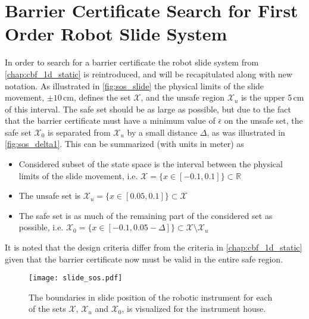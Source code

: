
\section{Barrier Certificate Search for First Order Robot Slide System}\label{sec:sos_search_1storder}
In order to search for a barrier certificate the robot slide system from \autoref{chap:cbf_1d_static} is reintroduced, and will be recapitulated along with new notation. As illustrated in \autoref{fig:sos_slide} the physical limits of the slide movement, $\pm 10$\,cm,  defines the set $\mathcal{X}$, and the unsafe region $\mathcal{X}_u$ is the upper 5\,cm of this interval. The safe set should be as large as possible, but due to the fact that the barrier certificate must have a minimum value of $\bar{\epsilon}$ on the unsafe set, the safe set $\mathcal{X}_0$ is separated from $\mathcal{X}_u$ by a small distance $\Delta$, as was illustrated in \autoref{fig:sos_delta1}. This can be summarized  (with units in meter) as
\vspace{-2mm}
\begin{itemize}
\itemsep-0.7mm
\item Considered subset of the state space is the interval between the physical limits of the slide movement, i.e. $\mathcal{X}=\{x\in [-0.1,0.1] \}\subset\mathbb{R}$
\item The unsafe set is $\mathcal{X}_u=\{x\in [0.05,0.1] \}\subset\mathcal{X}$
\item The safe set is as much of the remaining part of the considered set as possible, i.e. $\mathcal{X}_0=\{x\in [-0.1,0.05-\Delta] \}\subset\mathcal{X}\setminus\mathcal{X}_u$
\end{itemize}
It is noted that the design criteria differ from the criteria in \autoref{chap:cbf_1d_static} given that the barrier certificate now must be valid in the entire safe region.

\vspace{-2mm}
\begin{figure}[H]
	\centering\hspace{10mm}
\texttt{[image: slide\_sos.pdf]}
\caption{The boundaries in slide position of the robotic instrument for each of the sets $\mathcal{X}$, $\mathcal{X}_u$ and $\mathcal{X}_0$,  is visualized for the instrument house.}
	\label{fig:sos_slide}
\end{figure}

